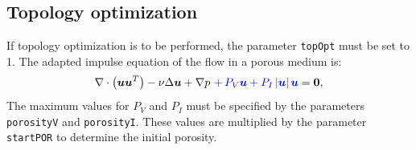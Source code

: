 \documentclass[oneside]{article}
\numberwithin{equation}{section}
\numberwithin{figure}{section}
\newcommand{\buu}{\boldsymbol{u}}
\newcommand{\bzz}{\boldsymbol{0}}
\numberwithin{figure}{section}
\begin{document}
\subsection{Topology optimization}
If topology optimization is to be performed, the parameter \texttt{topOpt} must be set to 1. The adapted impulse equation of the flow in a porous medium is:
\begin{equation}
\nabla \cdot \left(\buu \buu^{T} \right) -\nu \Delta \buu + \nabla p \, \, \textcolor{blue}{ + \, P_V \buu + P_I \left| \buu \right| \buu } = \bzz,
\end{equation}
The maximum values for $P_V$ and $P_I$ must be specified by the parameters \texttt{porosityV} and \texttt{porosityI}. These values are multiplied by the parameter \texttt{startPOR} to determine the initial porosity.
\end{document}
